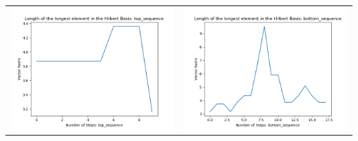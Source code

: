 \documentclass[10pt]{article}
\begin{document}
\begin{tabular}{c|c}
\begin{minipage}{.45\textwidth}
\includegraphics[width=\textwidth]{"DATA/4d/5 generators 2 bound C/top_sequence LENGTH"}
\end{minipage} &
\begin{minipage}{.45\textwidth}
\includegraphics[width=\textwidth]{"DATA/4d/5 generators 2 bound C bottomup/bottom_sequence LENGTH"}
\end{minipage}
\end{tabular}
\end{document}
